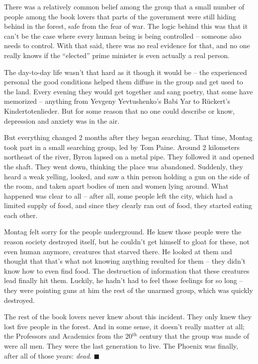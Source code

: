 \documentclass[]{article}
\begin{document}
    There was a relatively common belief among the group that a small number of people among the book lovers that parts of the government were still hiding behind in the forest, safe from the fear of war. The logic behind this was that it can't be the case where every human being is being controlled -- someone also needs to control. With that said, there was no real evidence for that, and no one really knows if the ``elected'' prime minister is even actually a real person. 
    
    The day-to-day life wasn't that hard as it though it would be -- the experienced personal the good conditions helped them diffuse in the group and get used to the land. Every evening they would get together and sang poetry, that some have memorized -- anything from Yevgeny Yevtushenko's Babi Yar to Rückert's Kindertotenlieder. But for some reason that no one could describe or know, depression and anxiety was in the air. 
    
    But everything changed 2 months after they began searching. That time, Montag took part in a small searching group, led by Tom Paine. Around 2 kilometers northeast of the river, Byron lapsed on a metal pipe. They followed it and opened the shaft. They went down, thinking the place was abandoned. Suddenly, they heard a weak yelling, looked, and saw a thin person holding a gun on the side of the room, and taken apart bodies of men and women lying around. What happened was clear to all -- after all, some people left the city, which had a limited supply of food, and since they clearly ran out of food, they started eating each other. 
    
    Montag felt sorry for the people underground. He knew those people were the reason society destroyed itself, but he couldn't get himself to gloat for these, not even human anymore, creatures that starved there. He looked at them and thought that that's what not knowing anything resulted for them -- they didn't know how to even find food. The destruction of information that these creatures lead finally hit them. Luckily, he hadn't had to feel those feelings for so long -- they were pointing guns at him the rest of the unarmed group, which was quickly destroyed. 
    
    
    The rest of the book lovers never knew about this incident. They only knew they lost five people in the forest. And in some sense, it doesn't really matter at all; the Professors and Academics from the 20$^{\text{th}}$ century that the group was made of were all men. They were the last generation to live. The Phoenix was finally, after all of those years: \textit{dead}. \hfill $\blacksquare$
    
\end{document}
